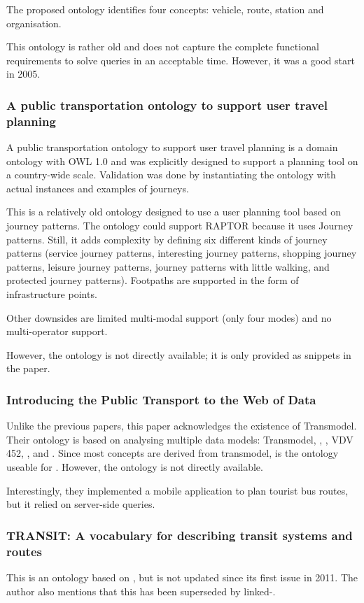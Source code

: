 The proposed ontology identifies four concepts: vehicle, route, station and organisation. 

This ontology is rather old and does not capture the complete functional requirements to solve queries in an acceptable time. However, it was a good start in 2005.
\subsubsection{A public transportation ontology to support user travel planning}
 A public transportation ontology to support user travel planning \cite{houda_public_2010} is a domain ontology with OWL 1.0 and was explicitly designed to support a planning tool on a country-wide scale. Validation was done by instantiating the ontology with actual instances and examples of journeys. 


This is a relatively old ontology designed to use a user planning tool based on journey patterns. The ontology could support RAPTOR because it uses Journey patterns. Still, it adds complexity by defining six different kinds of journey patterns (service journey patterns, interesting journey patterns, shopping journey patterns, leisure journey patterns, journey patterns with little walking, and protected journey patterns). Footpaths are supported in the form of infrastructure points.

Other downsides are limited multi-modal support (only four modes) and no multi-operator support.

However, the ontology is not directly available; it is only provided as snippets in the paper. 
\subsubsection{Introducing the Public Transport to the Web of Data}
Unlike the previous papers, this paper \cite{benatallah_introducing_2014} acknowledges the existence of Transmodel. Their ontology is based on analysing multiple data models: Transmodel, , , VDV 452, ,  and . Since most concepts are derived from transmodel, is the ontology useable for . However, the ontology is not directly available.

Interestingly, they implemented a mobile application to plan tourist bus routes, but it relied on server-side queries.
\subsubsection{TRANSIT: A vocabulary for describing transit systems and routes}
This is an ontology \cite{noauthor_transit_nodate} based on , but is not updated since its first issue in 2011. The author also mentions that this has been superseded by linked-.
